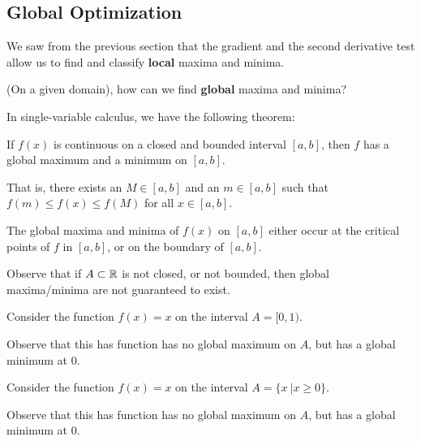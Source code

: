 \subsection{Global Optimization}

We saw from the previous section that the gradient and the second derivative test allow us to find and classify \textbf{local} maxima and minima.
    
    \begin{motivating}
    (On a given domain), how can we find \textbf{global} maxima and minima?
    \end{motivating}

In single-variable calculus, we have the following theorem:

\begin{theorem}
    If $f(x)$ is continuous on a closed and bounded interval $[a,b]$, then $f$ has a global maximum and a minimum on $[a,b]$.
    
    \vspace{1em}
    
    That is, there exists an $M \in [a,b]$ and an $m \in [a,b]$ such that $f(m) \leq f(x) \leq f(M)$ for all $x \in [a,b]$.
    \end{theorem}
    
    
    \begin{theorem}
    The global maxima and minima of $f(x)$ on $[a,b]$ either occur at the critical points of $f$ in $[a,b]$, or on the boundary of $[a,b]$.
    \end{theorem}

    \begin{remark}
    Observe that if $A \subset \mathbb{R}$ is not closed, or not bounded, then global maxima/minima are not guaranteed to exist.
    \end{remark}

    \begin{example}
        Consider the function $f(x) = x$ on the interval $A = [0,1)$.

        Observe that this has function has no global maximum on $A$, but has a global minimum at 0.
    \end{example}

    \begin{example}
        Consider the function $f(x) = x$ on the interval $A = \{x \ | x \geq 0 \}$.

        Observe that this has function has no global maximum on $A$, but has a global minimum at 0.
    \end{example}

